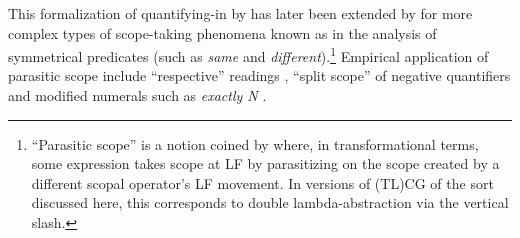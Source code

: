 \documentclass[output=paper
                ,modfonts
                ,nonflat
	        ,collection
	        ,collectionchapter
	        ,collectiontoclongg
 	        ,biblatex
                ,babelshorthands
                ,newtxmath
                ,draftmode
                ,colorlinks, citecolor=brown
]{./langsci/langscibook}
\begin{document}
This formalization of quantifying-in by \citet{oehrle1994} has later
been extended by \citet{barker07} for more complex types of
scope-taking phenomena known as  in the analysis
of symmetrical predicates (such as \textit{same} and
\textit{different}).\footnote{``Parasitic scope'' is a notion coined by
\citet{barker07} where, in transformational terms, some expression
takes scope at LF by parasitizing on the scope created by a different
scopal operator's LF movement. In versions of (TL)CG of the sort
discussed here, this corresponds to double lambda-abstraction via the
vertical slash.}
Empirical application of parasitic scope include ``respective'' readings
\citep{kubota-levine-resp},  
``split scope'' of negative quantifiers
\citep{kubota-levine-gapping} and modified numerals such as \textit{exactly N}
\citep{pollard-numerical}.
\end{document}
